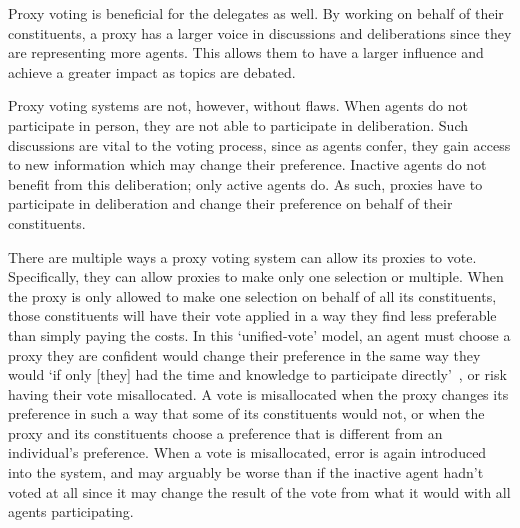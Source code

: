 Proxy voting is beneficial for the delegates as well.
By working on behalf of their constituents, a proxy has a larger voice in discussions
and deliberations since they are representing more agents.
This allows them to have a larger influence and achieve a greater impact as topics
are debated.

Proxy voting systems are not, however, without flaws.
When agents do not participate in person, they are not able to participate in
deliberation.
Such discussions are vital to the voting process, since as agents confer, they gain
access to new information which may change their preference.
Inactive agents do not benefit from this deliberation; only active agents do.
As such, proxies have to participate in deliberation and change their preference on
behalf of their constituents.

There are multiple ways a proxy voting system can allow its proxies to
vote.
Specifically, they can allow proxies to make only one selection or multiple.
When the proxy is only allowed to make one selection on behalf of all its
constituents, those constituents will have their vote applied in a way they find less
preferable than simply paying the costs.
In this `unified-vote' model, an agent must choose a proxy they are confident would
change their preference in the same way they would `if only [they] had the time and
knowledge to participate directly'~\cite{Miller1969}, or risk having their vote
misallocated.
A vote is misallocated when the proxy changes its preference in such a way that
some of its constituents would not, or when the proxy and its constituents choose a
preference that is different from an individual's preference.
When a vote is misallocated, error is again introduced into the system, and may
arguably be worse than if the inactive agent hadn't voted at all since it may change
the result of the vote from what it would with all agents participating.

